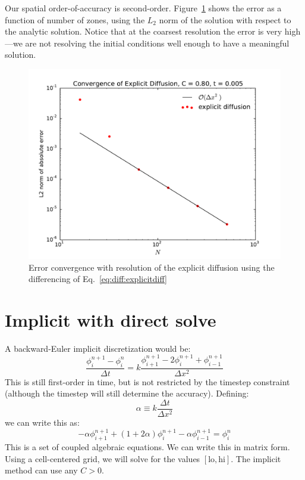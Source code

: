 Our spatial order-of-accuracy is second-order.
Figure~\ref{fig:diffexplicit_converge} shows the error as a function
of number of zones, using the $L_2$ norm of the solution with respect
to the analytic solution.  Notice that at the coarsest resolution
the error is very high---we are not resolving the initial conditions
well enough to have a meaningful solution.

\begin{figure}
\centering
\includegraphics[width=\linewidth]{diffexplicit-converge-0_8}
\caption[Error convergence of explicit diffusion]{\label{fig:diffexplicit_converge}
Error convergence with resolution of the explicit diffusion using the differencing of 
Eq.~\ref{eq:diff:explicitdiff}
 \\ }
\end{figure}

\section{Implicit with direct solve}

A backward-Euler implicit discretization would be:
\begin{equation}
\frac{\phi_i^{n+1} - \phi_i^n}{\Delta t} = 
  k \frac{\phi_{i+1}^{n+1} - 2\phi_i^{n+1} + \phi_{i-1}^{n+1}}{\Delta x^2}
\end{equation}
This is still first-order in time, but is not restricted by the timestep
constraint (although the timestep will still determine the accuracy).  
Defining:
\begin{equation}
\alpha \equiv k \frac{\Delta t}{\Delta x^2}
\end{equation}
we can write this as:
\begin{equation}
\label{eq:diff:implicit}
-\alpha \phi_{i+1}^{n+1} + (1 + 2\alpha) \phi_{i}^{n+1} - \alpha \phi_{i-1}^{n+1} = \phi_i^n
\end{equation}
This is a set of coupled algebraic equations.  We can write this in
matrix form.  Using a cell-centered grid, we will solve for the values
$[\mathrm{lo},\mathrm{hi}]$.  
The implicit method can use any $C > 0$.

